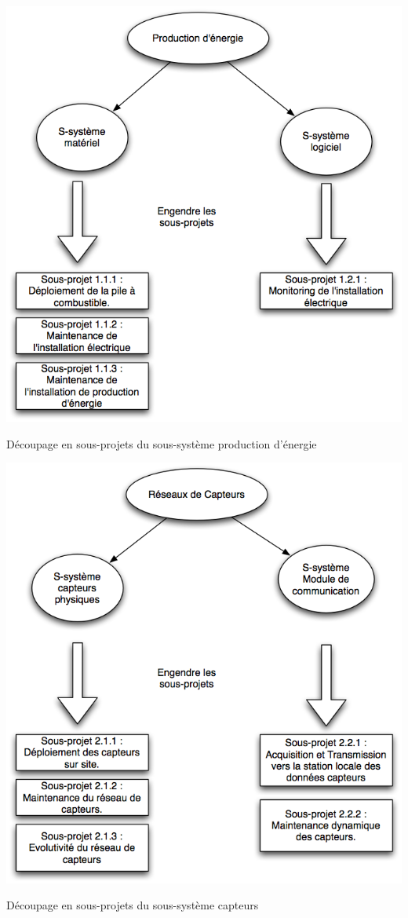 \begin {center}
\includegraphics[width=\textwidth]{png/ss1ProdE.png}
\caption{Découpage en sous-projets du sous-système production d'énergie}
\end {center} 

\begin {center}
\includegraphics[width=\textwidth]{png/ss1Capteurs.png}
\caption{Découpage en sous-projets du sous-système capteurs}
\end {center}

